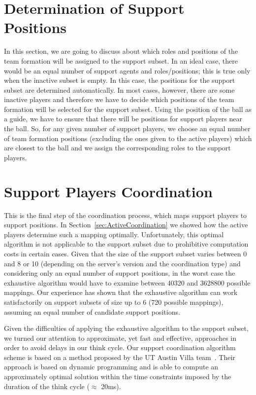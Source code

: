 \section{Determination of Support Positions}
In this section, we are going to discuss about which roles and positions of the team formation will be assigned to the support subset. In an ideal case, there would be an equal number of support agents and roles/positions; this is true only when the inactive subset is empty. In this case, the positions for the support subset are determined automatically. In most cases, however, there are some inactive players and therefore we have to decide which positions of the team formation will be selected for the support subset. Using the position of the ball as a guide, we have to ensure that there will be positions for support players near the ball. So, for any given number of support players, we choose an equal number of team formation positions (excluding the ones given to the active players) which are closest to the ball and we assign the corresponding roles to the support players. 



\section{Support Players Coordination}
This is the final step of the coordination process, which maps support players to support positions. In Section~\ref{sec:ActiveCoordination} we showed how the active players determine such a mapping optimally. Unfortunately, this optimal algorithm is not applicable to the support subset due to prohibitive computation costs in certain cases. Given that the size of the support subset varies between 0 and 8 or 10 (depending on the server's version and the coordination type) and considering only an equal number of support positions, in the worst case the exhaustive algorithm would have to examine between 40320 and 3628800 possible mappings. Our experience has shown that the exhaustive algorithm can work satisfactorily on support subsets of size up to 6 (720 possible mappings), assuming an equal number of candidate support positions.  

Given the difficulties of applying the exhaustive algorithm to the support subset, we turned our attention to approximate, yet fast and effective, approaches in order to avoid delays in our think cycle. Our support coordination algorithm scheme is based on a method proposed by the UT Austin Villa team~\cite{UtAustinVillaPaper}. Their approach is based on dynamic programming and is able to compute an approximately optimal solution within the time constraints imposed by the duration of the think cycle ($\approx$ 20ms).

